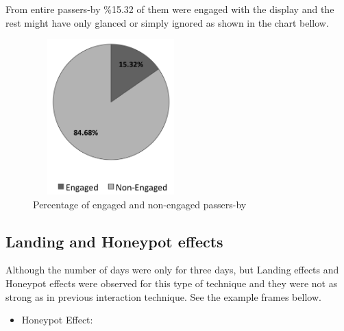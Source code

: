 From entire passers-by \%15.32 of them were engaged with the display and the rest might have only glanced or simply ignored as shown in the chart bellow.

\begin{figure}[H]
    \centering
    \includegraphics[width=60mm,height=60mm]{Figures/9/newbody_eng_percentage}
    \caption{Percentage of engaged and non-engaged passers-by}%
    \label{fig:newbodyengagedpasserbypercentage}%
\end{figure}


\newpage
\subsection{Landing and Honeypot effects}
Although the number of days were only for three days, but Landing effects \cite{LookingGlass} and Honeypot effects\cite{EnticingPeople} were observed for this type of technique and they were not as strong as in previous interaction technique. See the example frames bellow.


\begin{itemize}


\item Honeypot Effect:

\end{itemize}


